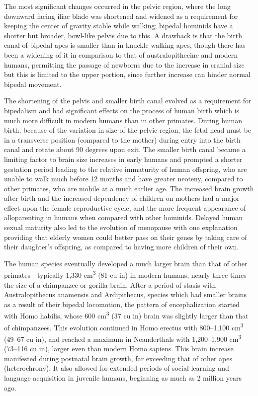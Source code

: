 The most significant changes occurred in the pelvic region, where the long downward facing iliac blade was shortened and widened as a requirement for keeping the center of gravity stable while walking; bipedal hominids have a shorter but broader, bowl-like pelvis due to this. A drawback is that the birth canal of bipedal apes is smaller than in knuckle-walking apes, though there has been a widening of it in comparison to that of australopithecine and modern humans, permitting the passage of newborns due to the increase in cranial size but this is limited to the upper portion, since further increase can hinder normal bipedal movement.

The shortening of the pelvis and smaller birth canal evolved as a requirement for bipedalism and had significant effects on the process of human birth which is much more difficult in modern humans than in other primates. During human birth, because of the variation in size of the pelvic region, the fetal head must be in a transverse position (compared to the mother) during entry into the birth canal and rotate about 90 degrees upon exit. The smaller birth canal became a limiting factor to brain size increases in early humans and prompted a shorter gestation period leading to the relative immaturity of human offspring, who are unable to walk much before 12 months and have greater neoteny, compared to other primates, who are mobile at a much earlier age. The increased brain growth after birth and the increased dependency of children on mothers had a major effect upon the female reproductive cycle, and the more frequent appearance of alloparenting in humans when compared with other hominids. Delayed human sexual maturity also led to the evolution of menopause with one explanation providing that elderly women could better pass on their genes by taking care of their daughter's offspring, as compared to having more children of their own.

The human species eventually developed a much larger brain than that of other primates---typically 1,330 cm\textsuperscript{3} (81 cu in) in modern humans, nearly three times the size of a chimpanzee or gorilla brain. After a period of stasis with Australopithecus anamensis and Ardipithecus, species which had smaller brains as a result of their bipedal locomotion, the pattern of encephalization started with Homo habilis, whose 600 cm\textsuperscript{3} (37 cu in) brain was slightly larger than that of chimpanzees. This evolution continued in Homo erectus with 800--1,100 cm\textsuperscript{3} (49--67 cu in), and reached a maximum in Neanderthals with 1,200--1,900 cm\textsuperscript{3} (73--116 cu in), larger even than modern Homo sapiens. This brain increase manifested during postnatal brain growth, far exceeding that of other apes (heterochrony). It also allowed for extended periods of social learning and language acquisition in juvenile humans, beginning as much as 2 million years ago.

